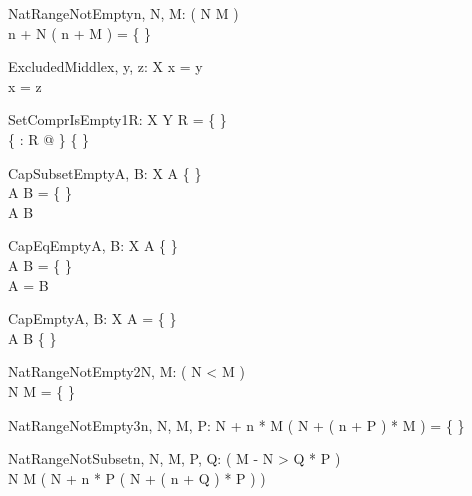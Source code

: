 \begin{theorem}{NatRangeNotEmpty}{n, \const N, \const M: \nat}
\eval( N \leq M ) \\
n + N \upto ( n + M ) = \{ \}
\end{theorem}

\begin{theorem}{ExcludedMiddle}{x, \const y, \const z: X}
x = y \\
x = z
\end{theorem}


\begin{theorem}{SetComprIsEmpty1}{R: X \rel Y}
R = \{ \} \\
\{ \anything : \dom R @ \anything \} \neq \{ \}
\end{theorem}

\begin{theorem}{CapSubsetEmpty}{A, B: \power X}
A \neq \{ \} \\
A \cap B = \{ \} \\
A \subset B
\end{theorem}

\begin{theorem}{CapEqEmpty}{A, B: \power X}
A \neq \{ \} \\
A \cap B = \{ \} \\
A = B
\end{theorem}

\begin{theorem}{CapEmpty}{A, B: \power X}
A = \{ \} \\
A \cap B \neq \{ \}
\end{theorem}

\begin{theorem}{NatRangeNotEmpty2}{\const N, \const M: \nat}
\eval( N < M ) \\
N \upto M = \{ \}
\end{theorem}

\begin{theorem}{NatRangeNotEmpty3}{n, \const N, \const M, \const P: \nat}
N + n * M \upto ( N + ( n + P ) * M ) = \{ \}
\end{theorem}

\begin{theorem}{NatRangeNotSubset}{n, \const N, \const M, \const P, \const Q: \nat}
\eval( M - N > Q * P ) \\
N \upto M \subset ( N + n * P \upto ( N + ( n + Q ) * P ) )
\end{theorem}

